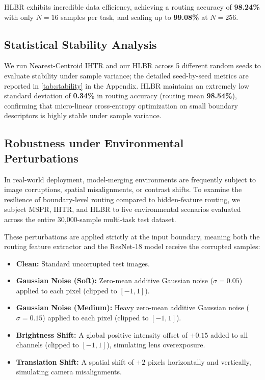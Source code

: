 \documentclass{article}
\theoremstyle{plain}
\theoremstyle{definition}
\theoremstyle{remark}
\begin{document}
HLBR exhibits incredible data efficiency, achieving a routing accuracy of \textbf{98.24\%} with only $N=16$ samples per task, and scaling up to \textbf{99.08\%} at $N=256$.

\subsection{Statistical Stability Analysis}
We run Nearest-Centroid IHTR and our HLBR across 5 different random seeds to evaluate stability under sample variance; the detailed seed-by-seed metrics are reported in \cref{tab:stability} in the Appendix. HLBR maintains an extremely low standard deviation of \textbf{0.34\%} in routing accuracy (routing mean \textbf{98.54\%}), confirming that micro-linear cross-entropy optimization on small boundary descriptors is highly stable under sample variance.

\subsection{Robustness under Environmental Perturbations}
In real-world deployment, model-merging environments are frequently subject to image corruptions, spatial misalignments, or contrast shifts. To examine the resilience of boundary-level routing compared to hidden-feature routing, we subject MSPR, IHTR, and HLBR to five environmental scenarios evaluated across the entire 30,000-sample multi-task test dataset. 

These perturbations are applied strictly at the input boundary, meaning both the routing feature extractor and the ResNet-18 model receive the corrupted samples:
\begin{itemize}
    \item \textbf{Clean:} Standard uncorrupted test images.
    \item \textbf{Gaussian Noise (Soft):} Zero-mean additive Gaussian noise ($\sigma = 0.05$) applied to each pixel (clipped to $[-1, 1]$).
    \item \textbf{Gaussian Noise (Medium):} Heavy zero-mean additive Gaussian noise ($\sigma = 0.15$) applied to each pixel (clipped to $[-1, 1]$).
    \item \textbf{Brightness Shift:} A global positive intensity offset of $+0.15$ added to all channels (clipped to $[-1, 1]$), simulating lens overexposure.
    \item \textbf{Translation Shift:} A spatial shift of $+2$ pixels horizontally and vertically, simulating camera misalignments.
\end{itemize}
\end{document}
